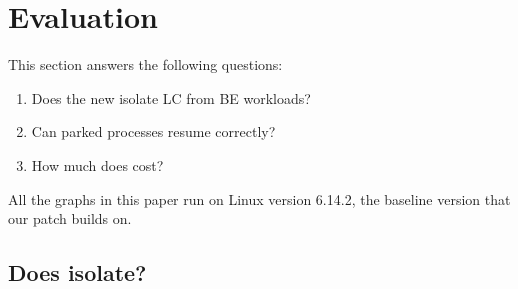 \section{Evaluation}
\label{s:eval}

This section answers the following questions:
\begin{enumerate}
    \item Does the new \schedbe{} isolate LC from BE workloads?
    \item Can parked processes resume correctly?
    \item How much does \schedbe{} cost?
\end{enumerate}

All the graphs in this paper run on Linux version 6.14.2, the baseline version
that our patch builds on. 

\subsection{Does \schedbe{} isolate?}

